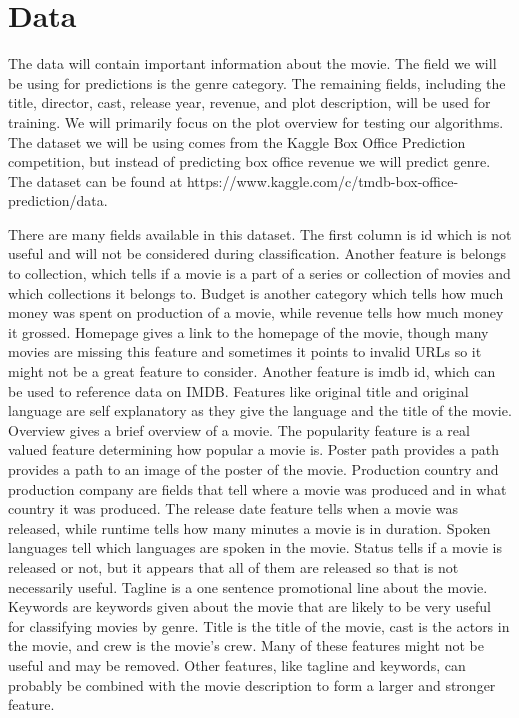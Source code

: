 \documentclass[sigconf]{acmart}
\begin{document}
\section{Data}

The data will contain important information about the movie. The field we will be using for predictions is the genre category. The remaining fields, including the title, director, cast, release year, revenue, and plot description, will be used for training. We will primarily focus on the plot overview for testing our algorithms. 
The dataset we will be using comes from the Kaggle Box Office Prediction competition, but instead of predicting box office revenue we will predict genre. The dataset can be found at https://www.kaggle.com/c/tmdb-box-office-prediction/data.
\linebreak

There are many fields available in this dataset. The first column is id which is not useful and will not be considered during classification.  Another feature is belongs to collection, which tells if a movie is a part of a series or collection of movies and which collections it belongs to. Budget is another category which tells how much money was spent on production of a movie, while revenue tells how much money it grossed. Homepage gives a link to the homepage of the movie, though many movies are missing this feature and sometimes it points to invalid URLs so it might not be a great feature to consider. Another feature is imdb id, which can be used to reference data on IMDB. Features like original title and original language are self explanatory as they give the language and the title of the movie. Overview gives a brief overview of a movie.  The popularity feature is a real valued feature determining how popular a movie is. Poster path provides a path provides a path to an image of the poster of the movie.  Production country and production company are fields that tell where a movie was produced and in what country it was produced. The release date feature tells when a movie was released, while runtime tells how many minutes a movie is in duration. Spoken languages tell which languages are spoken in the movie. Status tells if a movie is released or not, but it appears that all of them are released so that is not necessarily useful.  Tagline is a one sentence promotional line about the movie. Keywords are keywords given about the movie that are likely to be very useful for classifying movies by genre. Title is the title of the movie, cast is the actors in the movie, and crew is the movie's crew.  Many of these features might not be useful and may be removed.  Other features, like tagline and keywords, can probably be combined with the movie description to form a larger and stronger feature. 
\end{document}
